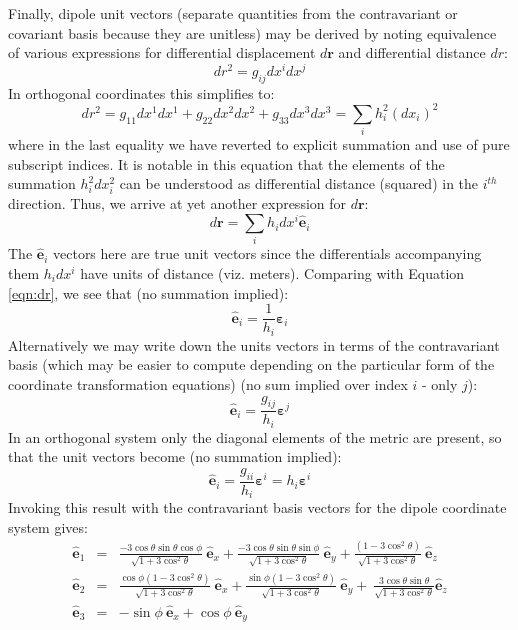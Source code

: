 \documentclass[11pt,letterpaper]{article}
\begin{document}
Finally, dipole unit vectors (separate quantities from the contravariant or covariant basis because they are unitless) may be derived by noting equivalence of various expressions for differential displacement $d \mathbf{r}$ and differential distance $dr$:
\begin{equation}
dr^2 = g_{ij} dx^i dx^j
\end{equation}
In orthogonal coordinates this simplifies to:
\begin{equation}
dr ^2 = g_{11} dx^1 dx^1 + g_{22} dx^2 dx^2 + g_{33} dx^3 dx^3 = \sum_i h_i^2 (dx_i)^2
\end{equation}
where in the last equality we have reverted to explicit summation and use of pure subscript indices.  It is notable in this equation that the elements of the summation $h_i^2 dx_i^2$ can be understood as differential distance (squared) in the $i^{th}$ direction.  Thus, we arrive at yet another expression for $d \mathbf{r}$:
\begin{equation}
d \mathbf{r} = \sum_i h_i dx^i \hat{\mathbf{e}}_i
\end{equation}
The $\hat{\mathbf{e}}_i$ vectors here are true unit vectors since the differentials accompanying them $h_i dx^i$ have units of distance (viz. meters).  Comparing with Equation \ref{eqn:dr}, we see that (no summation implied):
\begin{equation}
\hat{\mathbf{e}}_i = \frac{1}{h_i} \boldsymbol{\varepsilon}_i
\end{equation}
Alternatively we may write down the units vectors in terms of the contravariant basis (which may be easier to compute depending on the particular form of the coordinate transformation equations) (no sum implied over index $i$ - only $j$):
\begin{equation}
\hat{\mathbf{e}}_i = \frac{g_{ij}}{h_i} \boldsymbol{\varepsilon}^j
\end{equation}
In an orthogonal system only the diagonal elements of the metric are present, so that the unit vectors become (no summation implied):
\begin{equation}
\hat{\mathbf{e}}_i = \frac{g_{ii}}{h_i} \boldsymbol{\varepsilon}^i = h_i \boldsymbol{\varepsilon}^i 
\end{equation}
Invoking this result with the contravariant basis vectors for the dipole coordinate system gives:
\begin{eqnarray}
\hat{\mathbf{e}}_1 &=& \frac{-3 \cos \theta \sin \theta \cos \phi}{\sqrt{1+3 \cos^2 \theta } } ~ \hat{\mathbf{e}}_x + \frac{-3 \cos \theta \sin \theta \sin \phi}{\sqrt{1+3 \cos^2 \theta } } ~ \hat{\mathbf{e}}_y + \frac{\left( 1 - 3 \cos^2 \theta \right) }{\sqrt{1+3 \cos^2 \theta } }~ \hat{\mathbf{e}}_z \\
\hat{\mathbf{e}}_2 &=& \frac{\cos \phi \left(1 - 3 \cos^2 \theta \right)}{\sqrt{1 + 3 \cos^2 \theta}} ~ \hat{\mathbf{e}}_x + \frac{\sin \phi \left(1 - 3 \cos^2 \theta \right)}{\sqrt{1 + 3 \cos^2 \theta}}~ \hat{\mathbf{e}}_y + ~  \frac{3 \cos \theta \sin \theta}{\sqrt{1+3 \cos^2 \theta }} \hat{\mathbf{e}}_z \\
\hat{\mathbf{e}}_3 &=& - \sin \phi ~ \hat{\mathbf{e}}_x + \cos \phi ~ \hat{\mathbf{e}}_y
\end{eqnarray}
\end{document}
